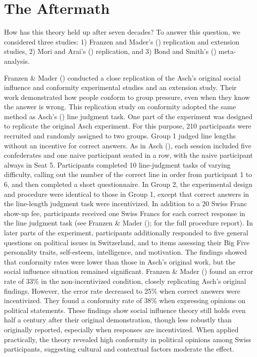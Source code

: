 \documentclass[
  letterpaper,
]{book}
\begin{document}
\section{The Aftermath}\label{the-aftermath-6}

How has this theory held up after seven decades? To answer this
question, we considered three studies: 1) Franzen and Mader's
() replication and extension
studies, 2) Mori and Arai's ()
replication, and 3) Bond and Smith's
() meta-analysis.

Franzen \& Mader () conducted a
close replication of the Asch's original social influence and conformity
experimental studies and an extension study. Their work demonstrated how
people conform to group pressure, even when they know the answer is
wrong. This replication study on conformity adopted the same method as
Asch's () line judgment task. One
part of the experiment was designed to replicate the original Asch
experiment. For this purpose, 210 participants were recruited and
randomly assigned to two groups. Group 1 judged line lengths without an
incentive for correct answers. As in Asch
(), each session included five
confederates and one naive participant seated in a row, with the naive
participant always in Seat 5. Participants completed 10 line-judgment
tasks of varying difficulty, calling out the number of the correct line
in order from participant 1 to 6, and then completed a short
questionnaire. In Group 2, the experimental design and procedure were
identical to those in Group 1, except that correct answers in the
line-length judgment task were incentivized. In addition to a 20 Swiss
Franc show-up fee, participants received one Swiss Francs for each
correct response in the line judgment task (see Franzen \& Mader
(); for the full procedure
report). In later parts of the experiment, participants additionally
responded to five general questions on political issues in Switzerland,
and to items assessing their Big Five personality traits, self-esteem,
intelligence, and motivation. The findings showed that conformity rates
were lower than those in Asch's original work, but the social influence
situation remained significant. Franzen \& Mader
() found an error rate of 33\% in
the non-incentivized condition, closely replicating Asch's original
findings. However, the error rate decreased to 25\% when correct answers
were incentivized. They found a conformity rate of 38\% when expressing
opinions on political statements. These findings show social influence
theory still holds even half a century after their original
demonstration, though less robustly than originally reported, especially
when responses are incentivized. When applied practically, the theory
revealed high conformity in political opinions among Swiss participants,
suggesting cultural and contextual factors moderate the effect.
\end{document}
